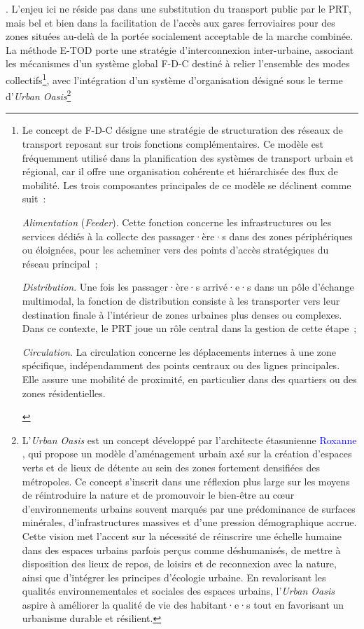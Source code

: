 \begin{refsegment}
{}. L’enjeu ici ne réside pas dans une substitution du transport public par le \acrshort{PRT}, mais bel et bien dans la facilitation de l’accès aux gares ferroviaires pour des zones situées au-delà de la portée socialement acceptable de la marche combinée. La méthode \acrshort{E-TOD} porte une stratégie d'interconnexion inter-urbaine, associant les mécanismes d'un système global \acrfull{F-D-C} destiné à relier l'ensemble des modes collectifs\footnote{
    Le concept de \acrfull{F-D-C} désigne une stratégie de structuration des réseaux de transport reposant sur trois fonctions complémentaires. Ce modèle est fréquemment utilisé dans la planification des systèmes de transport urbain et régional, car il offre une organisation cohérente et hiérarchisée des flux de mobilité. Les trois composantes principales de ce modèle se déclinent comme suit~:
        \begin{customitemize}
    \item \textsl{Alimentation} (\textsl{Feeder}). Cette fonction concerne les infrastructures ou les services dédiés à la collecte des passager·ère·s dans des zones périphériques ou éloignées, pour les acheminer vers des points d’accès stratégiques du réseau principal~;
    \item \textsl{Distribution}. Une fois les passager·ère·s arrivé·e·s dans un pôle d'échange multimodal, la fonction de distribution consiste à les transporter vers leur destination finale à l’intérieur de zones urbaines plus denses ou complexes. Dans ce contexte, le \acrshort{PRT} joue un rôle central dans la gestion de cette étape~;
    \item \textsl{Circulation}. La circulation concerne les déplacements internes à une zone spécifique, indépendamment des points centraux ou des lignes principales. Elle assure une mobilité de proximité, en particulier dans des quartiers ou des zones résidentielles.
        \end{customitemize}
}, avec l'intégration d'un système d'organisation désigné sous le terme d'\textsl{Urban Oasis}\footnote{
    L’\textsl{Urban Oasis} est un concept développé par l’architecte étasunienne \textcolor{blue}{Roxanne} \textcolor{blue}{\textcite{warren_urban_1997}}, qui propose un modèle d’aménagement urbain axé sur la création d’espaces verts et de lieux de détente au sein des zones fortement densifiées des métropoles. Ce concept s’inscrit dans une réflexion plus large sur les moyens de réintroduire la nature et de promouvoir le bien-être au cœur d’environnements urbains souvent marqués par une prédominance de surfaces minérales, d’infrastructures massives et d’une pression démographique accrue. Cette vision met l’accent sur la nécessité de réinscrire une échelle humaine dans des espaces urbains parfois perçus comme déshumanisés, de mettre à disposition des lieux de repos, de loisirs et de reconnexion avec la nature, ainsi que d'intégrer les principes d’écologie urbaine. En revalorisant les qualités environnementales et sociales des espaces urbains, l’\textsl{Urban Oasis} aspire à améliorer la qualité de vie des habitant·e·s tout en favorisant un urbanisme durable et résilient.
}
\end{refsegment}
